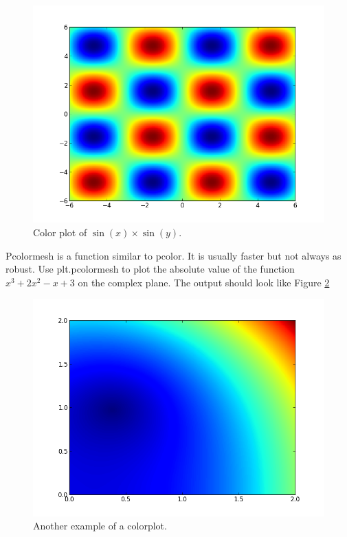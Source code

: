 \begin{figure}
\includegraphics[width=\textwidth]{pcolor.png}
\caption{Color plot of $\sin\left(x\right)\times\sin\left(y\right)$.}
\label{mpl:pcolor}
\end{figure}

\begin{problem}
Pcolormesh is a function similar to pcolor. It is usually faster but not always as robust.
Use plt.pcolormesh to plot the absolute value of the function $x^3 +2x^2 -x +3$ on the complex plane.
The output should look like Figure \ref{mpl:pcolormesh}
\end{problem}

\begin{figure}
\includegraphics[width=\textwidth]{pcolor2.png}
\caption{Another example of a colorplot.}
\label{mpl:pcolormesh}
\end{figure}


